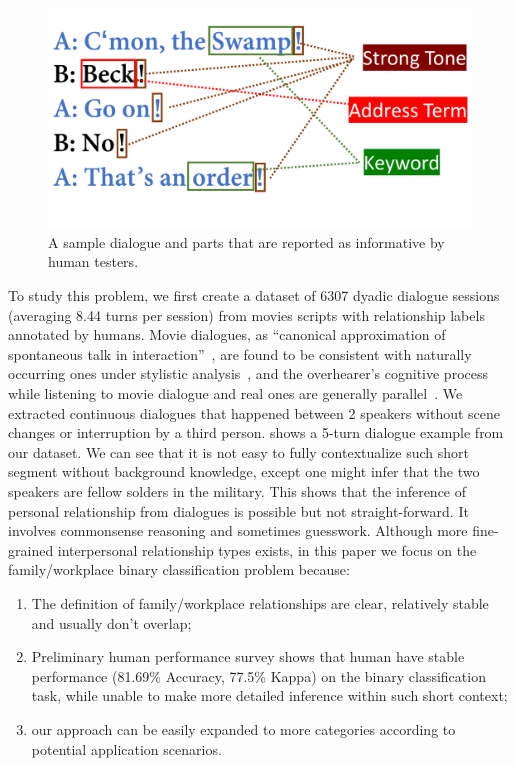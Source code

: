 \begin{figure}[t!]
	\centering
	\includegraphics[width=0.85\columnwidth]{instinct.pdf}
	\caption{A sample dialogue and parts that are 
reported as informative by human testers. }
	\label{fig:instinct}
\end{figure}
To study this problem, we first create a dataset of 6307 dyadic dialogue 
sessions (averaging 8.44 turns per session) from movies scripts with relationship labels annotated by humans. 
Movie dialogues, as ``canonical approximation of spontaneous 
talk in interaction''~\cite{canonical}, are found to be 
consistent with naturally occurring ones under stylistic analysis~\cite{FSC}, and the 
overhearer's cognitive process while listening to movie dialogue and real ones
are generally parallel~\cite{overhearer}. We extracted continuous
dialogues that happened between 2 speakers without scene changes or interruption
by a third person. 
 shows a 5-turn dialogue example from our dataset. 
We can see that it is not easy to fully contextualize such short segment 
without background knowledge, except one might infer  
that the two speakers are fellow solders in the military.
This shows that the inference of personal relationship from dialogues
is possible but not straight-forward. 
It involves commonsense reasoning and sometimes guesswork. 
Although more fine-grained interpersonal relationship types exists, 
in this paper we focus on the family/workplace binary classification 
problem because: 
\begin{enumerate}[label=(\roman*)]
\item The definition of family/workplace relationships are clear, relatively
stable and usually don't overlap; 
\item Preliminary human performance survey shows that human 
have stable performance (81.69\% Accuracy, 77.5\% Kappa) on the 
binary classification task, while unable to make more detailed inference 
within such short context; 
\item our approach can be easily expanded to more categories according 
to potential application scenarios.
\end{enumerate}

